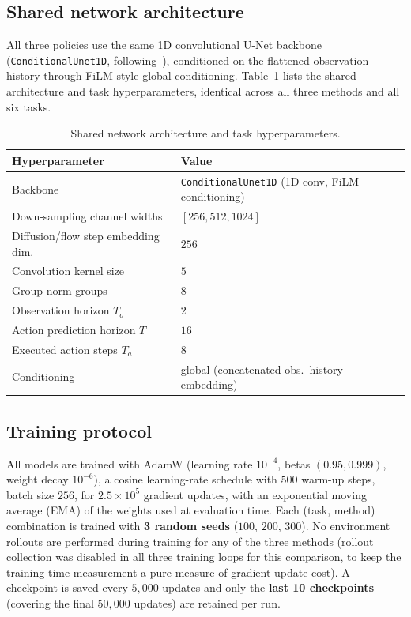 \documentclass[11pt]{article}
\begin{document}
\subsection{Shared network architecture}
\label{sec:arch}

All three policies use the same 1D convolutional U-Net backbone
(\texttt{ConditionalUnet1D}, following~\cite{chi2023diffusion}), conditioned
on the flattened observation history through FiLM-style global
conditioning. Table~\ref{tab:arch} lists the shared architecture and task
hyperparameters, identical across all three methods and all six tasks.

\begin{table}[H]
\centering
\caption{Shared network architecture and task hyperparameters.}
\label{tab:arch}
\begin{tabular}{ll}
\toprule
Hyperparameter & Value \\
\midrule
Backbone & \texttt{ConditionalUnet1D} (1D conv, FiLM conditioning) \\
Down-sampling channel widths & $[256, 512, 1024]$ \\
Diffusion/flow step embedding dim. & $256$ \\
Convolution kernel size & $5$ \\
Group-norm groups & $8$ \\
Observation horizon $T_o$ & $2$ \\
Action prediction horizon $T$ & $16$ \\
Executed action steps $T_a$ & $8$ \\
Conditioning & global (concatenated obs.\ history embedding) \\
\bottomrule
\end{tabular}
\end{table}

\subsection{Training protocol}

All models are trained with AdamW (learning rate $10^{-4}$, betas
$(0.95, 0.999)$, weight decay $10^{-6}$), a cosine learning-rate schedule
with $500$ warm-up steps, batch size $256$, for $2.5\times10^{5}$ gradient
updates, with an exponential moving average (EMA) of the weights used at
evaluation time. Each (task, method) combination is trained with \textbf{3
random seeds} ($100$, $200$, $300$). No environment rollouts are performed
during training for any of the three methods (rollout collection was
disabled in all three training loops for this comparison, to keep the
training-time measurement a pure measure of gradient-update cost). A
checkpoint is saved every $5{,}000$ updates and only the \textbf{last 10
checkpoints} (covering the final $50{,}000$ updates) are retained per run.
\end{document}
